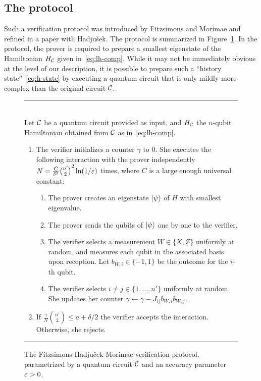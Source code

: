 \subsection{The protocol}

Such a verification protocol was introduced by Fitzsimons and Morimae and refined in a paper with Hadju\v{s}ek. The protocol is summarized in Figure~\ref{fig:fhm-protocol}. In the protocol, the prover is required to prepare a smallest eigenstate of the Hamiltonian $H_{\mathcal{C}}$ given in~\eqref{eq:lh-comp}. While it may not be immediately obvious at the level of our description, it is possible to prepare such a ``history state''~\eqref{eq:h-state} by executing a quantum circuit that is only mildly more complex than the original circuit $\mathcal{C}$. 

\begin{figure}[htbp]
\rule[1ex]{16.5cm}{0.5pt}\\
Let $\mathcal{C}$ be a quantum circuit provided as input, and $H_{\mathcal{C}}$ the $n$-qubit Hamiltonian obtained from $\mathcal{C}$ as in~\eqref{eq:lh-comp}. 
\begin{enumerate}
\item The verifier initializes a counter $\gamma$ to $0$. She executes the following interaction with the prover independently $N=\frac{C}{\delta^2} {n' \choose 2}^2 \ln(1/\varepsilon)$ times, where $C$ is a large enough universal constant:
\begin{enumerate}
\item The prover creates an eigenstate $|\psi\rangle$ of $H$ with smallest eigenvalue. 
\item The prover sends the qubits of $|\psi\rangle$ one by one to the verifier.
\item The verifier selects a measurement $W\in\{X,Z\}$ uniformly at random, and measures each qubit in the associated basis upon reception. Let $b_{W,i}\in\{-1,1\}$ be the outcome for the $i$-th qubit. 
\item The verifier selects $i\neq j \in \{1,\ldots,n'\}$ uniformly at random. She updates her counter $\gamma \leftarrow \gamma - J_{ij} b_{W,i} b_{W,j}$.
\end{enumerate}
\item If $\frac{\gamma}{N }{n' \choose 2} \leq a + \delta/2$ the verifier accepts the interaction. Otherwise, she rejects. 
\end{enumerate}
\rule[1ex]{16.5cm}{0.5pt}
\caption{The Fitzsimons-Hadju\v{c}ek-Morimae verification protocol, parametrized by a quantum circuit $\mathcal{C}$ and an accuracy parameter $\varepsilon>0$.}
\label{fig:fhm-protocol}
\end{figure}

